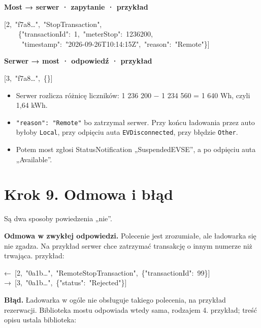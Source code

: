 \documentclass[11pt,a4paper]{article}
\begin{document}
\textbf{Most {\symbolfont→} serwer · zapytanie ·  przykład}


\begin{kodbox}
\mbox{}[2,\ "f7a8…",\ "StopTransaction",\\
\mbox{}\ \ \ \ \{"transactionId":\ 1,\ "meterStop":\ 1236200,\\
\mbox{}\ \ \ \ \ "timestamp":\ "2026-09-26T10:14:15Z",\ "reason":\ "Remote"\}]
\end{kodbox}

\textbf{Serwer {\symbolfont→} most · odpowiedź ·  przykład}


\begin{kodbox}
\mbox{}[3,\ "f7a8…",\ \{\}]
\end{kodbox}

\begin{itemize}
\item Serwer rozlicza różnicę liczników: 1 236 200 − 1 234 560 = 1 640 Wh, czyli 1,64 kWh.
\item \texttt{"reason":\allowbreak{} "Remote"} bo zatrzymał serwer. Przy końcu ładowania przez auto byłoby \texttt{Local}, przy odpięciu auta \texttt{EVDisconnected}, przy błędzie \texttt{Other}.
\item Potem most zgłosi StatusNotification „SuspendedEVSE”, a po odpięciu auta „Available”.
\end{itemize}

\section*{Krok 9. Odmowa i błąd}

Są dwa sposoby powiedzenia „nie”.


\textbf{Odmowa w zwykłej odpowiedzi.} Polecenie jest zrozumiałe, ale ładowarka się nie zgadza. Na przykład serwer chce zatrzymać transakcję o innym numerze niż trwająca.  przykład:


\begin{kodbox}
\mbox{}{\symbolfont←}\ [2,\ "0a1b…",\ "RemoteStopTransaction",\ \{"transactionId":\ 99\}]\\
\mbox{}{\symbolfont→}\ [3,\ "0a1b…",\ \{"status":\ "Rejected"\}]
\end{kodbox}

\textbf{Błąd.} Ładowarka w ogóle nie obsługuje takiego polecenia, na przykład rezerwacji. Biblioteka mostu odpowiada wtedy sama, rodzajem 4.  przykład; treść opisu ustala biblioteka:
\end{document}
